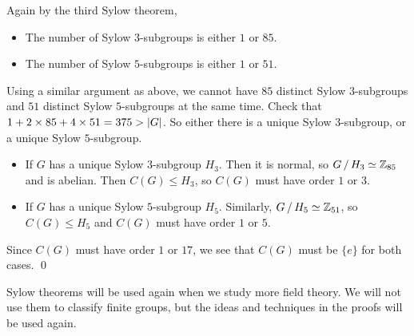 Again by the third Sylow theorem,
\begin{itemize}
    \item The number of Sylow \(3\)-subgroups is either \(1\) or \(85\).
    \item The number of Sylow \(5\)-subgroups is either \(1\) or \(51\).
\end{itemize}
Using a similar argument as above, we cannot have \(85\) distinct Sylow \(3\)-subgroups and \(51\) distinct Sylow \(5\)-subgroups at the same time. Check that \(1 + 2 \times 85 + 4 \times 51 = 375 > \left| G \right|\). So either there is a unique Sylow \(3\)-subgroup, or a unique Sylow \(5\)-subgroup.
\begin{itemize}
    \item If \(G\) has a unique Sylow \(3\)-subgroup \(H_3\). Then it is normal, so \(G \operatorname{/} H_3 \simeq \mathbb{Z}_{85}\) and is abelian. Then \(C(G) \leq H_3\), so \(C(G)\) must have order \(1\) or \(3\).

    \item If \(G\) has a unique Sylow \(5\)-subgroup \(H_5\). Similarly, \(G \operatorname{/} H_5 \simeq \mathbb{Z}_{51}\), so \(C(G) \leq H_5\) and \(C(G)\) must have order \(1\) or \(5\).
\end{itemize}
Since \(C(G)\) must have order \(1\) or \(17\), we see that \(C(G)\) must be \(\{e\}\) for both cases. \qed

Sylow theorems will be used again when we study more field theory. We will not use them to classify finite groups, but the ideas and techniques in the proofs will be used again.

\pagebreak
